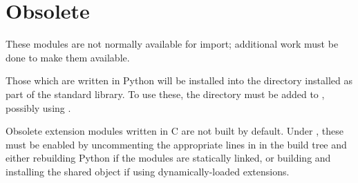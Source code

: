 \section{Obsolete \label{obsolete-modules}}

These modules are not normally available for import; additional work
must be done to make them available.

Those which are written in Python will be installed into the directory 
 installed as part of the standard library.  To use
these, the directory must be added to , possibly using
.

Obsolete extension modules written in C are not built by default.
Under \UNIX, these must be enabled by uncommenting the appropriate
lines in  in the build tree and either rebuilding
Python if the modules are statically linked, or building and
installing the shared object if using dynamically-loaded extensions.


